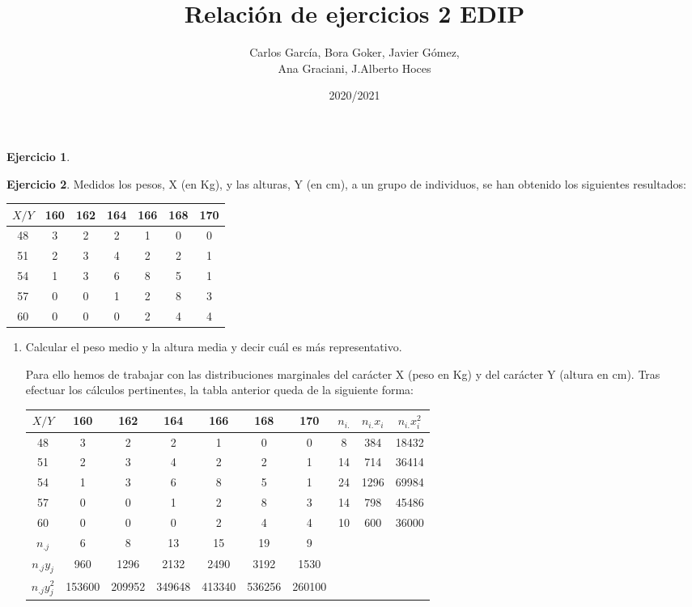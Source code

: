 \documentclass[a4paper, 12pt]{article}
\title{\textbf{Relación de ejercicios 2 EDIP}}
\author{Carlos García, Bora Goker, Javier Gómez,  \\ Ana Graciani, J.Alberto Hoces}
\date{2020/2021}
\theoremstyle{definition}
\newtheorem{ej}{Ejercicio}
\begin{document}
\maketitle

\begin{ej}

\end{ej}

\begin{ej}
Medidos los pesos, X (en Kg), y las alturas, Y (en cm), a un grupo de individuos, se han obtenido
los siguientes resultados:

\begin{center}
\begin{tabular}{c|cccccc}
	\(X/Y\) & 160 & 162 & 164 & 166 & 168 & 170 \\
	\hline
	48 & 3 & 2 & 2 & 1 & 0 & 0 \\
	51 & 2 & 3 & 4 & 2 & 2 & 1 \\
	54 & 1 & 3 & 6 & 8 & 5 & 1 \\
	57 & 0 & 0 & 1 & 2 & 8 & 3 \\
	60 & 0 & 0 & 0 & 2 & 4 & 4\\
\end{tabular}
\end{center}

\begin{enumerate}[label=\alph*)]
	\item Calcular el peso medio y la altura media y decir cuál es más representativo.
	
	Para ello hemos de trabajar con las distribuciones marginales del carácter X (peso en Kg) y del carácter Y (altura en cm). Tras efectuar los cálculos pertinentes, la tabla anterior queda de la siguiente forma:
	
	\begin{center}
\begin{tabular}{c|ccccccccc}
	\(X/Y\) & 160 & 162 & 164 & 166 & 168 & 170 & \(n_{i.}\) & \(n_{i.}x_i\) & \(n_{i.}x_i^2\) \\
	\hline
	48 & 3 & 2 & 2 & 1 & 0 & 0 & 8 & 384 & 18432 \\
	51 & 2 & 3 & 4 & 2 & 2 & 1 & 14 & 714 & 36414\\
	54 & 1 & 3 & 6 & 8 & 5 & 1 & 24 & 1296 & 69984\\
	57 & 0 & 0 & 1 & 2 & 8 & 3 & 14 & 798 & 45486\\
	60 & 0 & 0 & 0 & 2 & 4 & 4 & 10 & 600 & 36000\\
	\(n_{.j}\) & 6 & 8 & 13 & 15 & 19 & 9\\
	\(n_{.j} y_j\) & 960 & 1296 & 2132 & 2490 & 3192 & 1530\\
	\(n_{.j} y_j^2\) & 153600 & 209952 & 349648 & 413340 & 536256 & 260100\\
\end{tabular}
\end{center}


\end{enumerate}
\end{ej}
\end{document}
